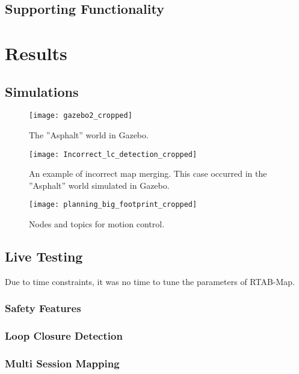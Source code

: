 \subsection{Supporting Functionality}

\section{Results}

\subsection{Simulations}

\begin{figure}[p]
	\centering
	\texttt{[image: gazebo2\_cropped]}
	\caption{The ''Asphalt'' world in Gazebo. }
	\label{fig:Incorrect_lc_detection}
\end{figure}

\begin{figure}[p]
	\centering
	\texttt{[image: Incorrect\_lc\_detection\_cropped]}
	\caption{An example of incorrect map merging. This case occurred in the ''Asphalt'' world simulated in Gazebo.}
	\label{fig:Incorrect_lc_detection}
\end{figure}

\begin{figure}[p]
	\centering
	\texttt{[image: planning\_big\_footprint\_cropped]}
	\caption{Nodes and topics for motion control. }
	\label{fig:big_footprint}
\end{figure}

\subsection{Live Testing}

Due to time constraints, it was no time to tune the parameters of \ac{RTAB-Map}.

\subsubsection{Safety Features}

\subsubsection{Loop Closure Detection}

\subsubsection{Multi Session Mapping}

